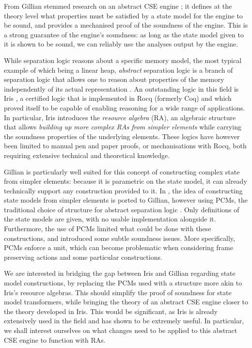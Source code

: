 From Gillian stemmed research on an abstract CSE engine \cite{cse1,cse2}; it defines at the theory level what properties must be satisfied by a state model for the engine to be sound, and provides a mechanised proof of the soundness of the engine. This is a strong guarantee of the engine's soundness: as long as the state model given to it is shown to be sound, we can reliably use the analyses output by the engine.

While separation logic reasons about a specific memory model, the most typical example of which being a linear heap, \emph{abstract} separation logic is a branch of separation logic that allows one to reason about properties of the memory independently of its actual representation \cite{higherorderseplogic,abstractseplogic}. An outstanding logic in this field is Iris \cite{iris}, a certified logic that is implemented in Rocq (formerly Coq) \cite{coq} and which proved itself to be capable of enabling reasoning for a wide range of applications. In particular, Iris introduces the \emph{resource algebra} (RA), an algebraic structure that allows \emph{building up more complex RAs from simpler elements} while carrying the soundness properties of the underlying elements. These logics have however been limited to manual pen and paper proofs, or mechanisations with Rocq, both requiring extensive technical and theoretical knowledge.

Gillian is particularly well suited for this concept of constructing complex state from simpler elements: because it is parametric on the state model, it can already technically support any construction provided to it. In \cite{sacha-phd}, the idea of constructing state models from simpler elements is ported to Gillian, however using PCMs, the traditional choice of structure for abstract separation logic \cite{abstractseplogic,sepalgebra,iris1,higherorderseplogic}. Only definitions of the state models are given, with no usable implementation alongside it. Furthermore, the use of PCMs limited what could be done with these constructions, and introduced some subtle soundness issues. More specifically, PCMs enforce a unit, which can become problematic when considering frame preserving actions and some particular constructions.

We are interested in bridging the gap between Iris and Gillian regarding state model constructions, by replacing the PCMs used with a structure more akin to Iris's resource algebras. This should simplify the proof of soundness for state model transformers, while bringing the theory of an abstract CSE engine closer to the theory developed in Iris. This would be significant, as Iris is already extensively used in the field and has shown to be extremely useful. In particular, we shall interest ourselves on what changes need to be applied to this abstract CSE engine to function with RAs.

